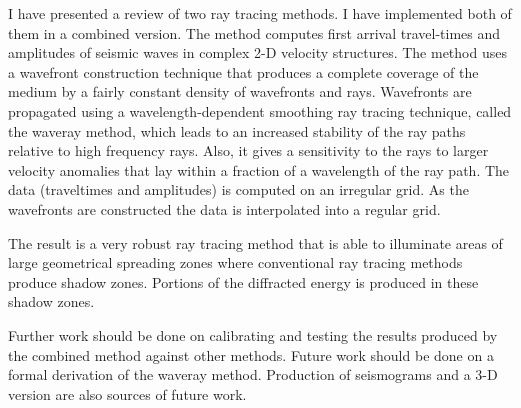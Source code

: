 I have presented a review of two ray tracing methods. I have 
implemented both of them in a combined version. The method 
computes first arrival travel-times and amplitudes of seismic 
waves in complex \mbox{2-D} velocity structures. 
The method uses a wavefront construction technique that produces
a complete coverage of the medium by a fairly
constant density of wavefronts and rays. Wavefronts are 
propagated using a wavelength-dependent smoothing ray tracing
technique, called the waveray method, which leads to an increased 
stability of the ray paths
relative to high frequency rays. Also, it gives a sensitivity to
the rays to larger velocity anomalies that lay within a fraction
of a wavelength of the ray path. The data (traveltimes and amplitudes)
is computed on an irregular grid. As the wavefronts are constructed 
the data is interpolated into a regular grid.

The result is a very robust ray tracing method that is able to 
illuminate areas of large geometrical spreading zones where
conventional ray tracing methods produce shadow zones. Portions
of the diffracted energy is produced in these shadow zones.

Further work should be done on calibrating and testing the results produced
by the combined method against other methods. Future work
should be done on a formal derivation of the waveray method.
Production of seismograms and a {\mbox 3-D} version are also
sources of future work.




